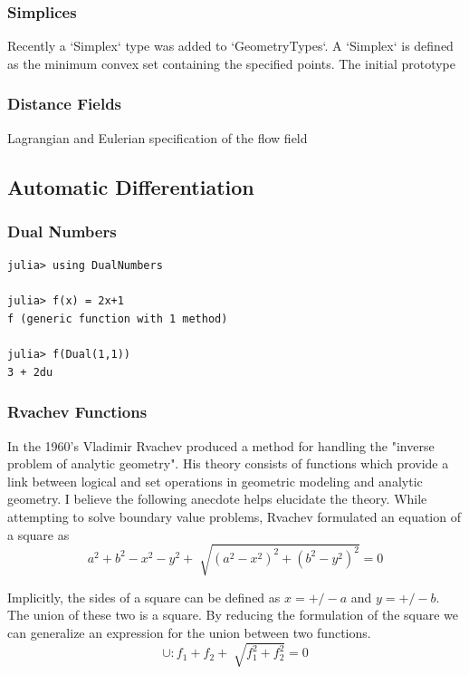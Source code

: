\documentclass[a4paper]{article}
\begin{document}
\subsubsection{Simplices}

Recently a `Simplex` type was added to `GeometryTypes`. A `Simplex` is defined
as the minimum convex set containing the specified points. The initial
prototype

\subsubsection{Distance Fields}

Lagrangian and Eulerian specification of the flow field



\subsection{Automatic Differentiation}

\subsubsection{Dual Numbers}
\begin{lstlisting}
julia> using DualNumbers

julia> f(x) = 2x+1
f (generic function with 1 method)

julia> f(Dual(1,1))
3 + 2du
\end{lstlisting}


\subsubsection{Rvachev Functions}


In the 1960's Vladimir Rvachev produced a method for handling the "inverse
problem of analytic geometry". His theory consists of functions which provide a
link between logical and set operations in geometric modeling and analytic
geometry.\cite{shapiro1991theory} I believe the following anecdote helps
elucidate the theory. While attempting to solve boundary value problems,
Rvachev formulated an equation of a square as
\begin{equation*}
a^2 + b^2 − x^2 − y^2 + \sqrt[]{( a^2 − x^2 )^2 +( b^2 − y^2 )^2} =0
\end{equation*}

Implicitly, the sides of a square can be defined as $x= +/- a$ and $y= +/- b$.
The union of these two is a square. By reducing the formulation of the square
we can generalize an expression for the union between two functions.
\begin{equation*}
\cup : f_1 + f_2 + \sqrt[]{f_1^2 +f_2^2} =0
\end{equation*}
\end{document}
